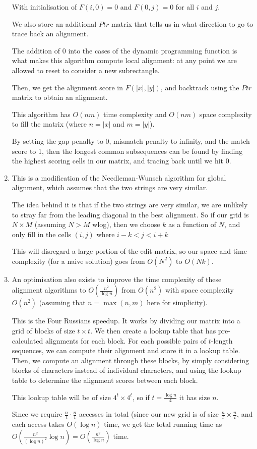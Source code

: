 \begin{enumerate}[label=(\alph*)]
With initialisation of $F(i,0) = 0$ and $F(0, j) = 0$ for all $i$ and $j$.

We also store an additional $Ptr$ matrix that tells us in what direction to go to trace back an alignment.

The addition of 0 into the cases of the dynamic programming function is what makes this algorithm compute local alignment: at any point we are allowed to reset to consider a new subrectangle.

Then, we get the alignment score in $F(|x|, |y|)$, and backtrack using the $Ptr$ matrix to obtain an alignment.


This algorithm has $O(nm)$ time complexity and $O(nm)$ space complexity to fill the matrix (where $n = |x|$ and $m = |y|$).

By setting the gap penalty to 0, mismatch penalty to infinity, and the match score to 1, then the longest common subsequences can be found by finding the highest scoring cells in our matrix, and tracing back until we hit 0.

\item
  This is a modification of the Needleman-Wunsch algorithm for global alignment, which assumes that the two strings are very similar.

  The idea behind it is that if the two strings are very similar, we are unlikely to stray far from the leading diagonal in the best alignment. So if our grid is $N \times M$ (assuming $N > M$ wlog), then we choose $k$ as a function of $N$, and only fill in the cells $(i,j)$ where $i - k < j < i + k$

  This will disregard a large portion of the edit matrix, so our space and time complexity (for a naive solution) goes from $O(N^2)$ to $O(Nk)$.

  \item
An optimisation also exists to improve the time complexity of these alignment algorithms to $O(\frac{n^2}{\log n})$ from $O(n^2)$ with space complexity $O(n^2)$ (assuming that $n = \max(n,m)$ here for simplicity).

This is the Four Russians speedup. It works by dividing our matrix into a grid of blocks of size $t \times t$. We then create a lookup table that has pre-calculated alignments for each block. For each possible pairs of $t$-length sequences, we can compute their alignment and store it in a lookup table. Then, we compute an alignment through these blocks, by simply considering blocks of characters instead of individual characters, and using the lookup table to determine the alignment scores between each block.

This lookup table will be of size $4^t \times 4^t$, so if $t = \frac{\log n}{4}$ it has size $n$.

Since we require $\frac{n}{t} \cdot \frac{n}{t}$ accesses in total (since our new grid is of size $\frac{n}{t} \times \frac{n}{t}$, and each access takes $O(\log n)$ time, we get the total running time as $O(\frac{n^2}{(\log n)^2} \log n) = O(\frac{n^2}{\log n})$ time.


        
    \end{enumerate}

